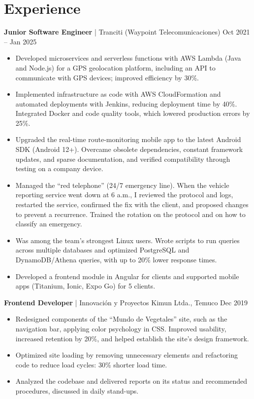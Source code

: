 \documentclass[10pt,letterpaper]{article}
\newcommand{\cvjob}[3]{%
  \vspace{5pt}%
  \textbf{#1} | #2 \hfill #3\par\vspace{1pt}}
\begin{document}
\section{Experience}

\cvjob{Junior Software Engineer}{Tranciti (Waypoint Telecomunicaciones)}{Oct 2021 -- Jan 2025}
\begin{itemize}
  \item Developed microservices and serverless functions with AWS Lambda (Java and Node.js) for a GPS geolocation platform, including an API to communicate with GPS devices; improved efficiency by 30\%.
  \item Implemented infrastructure as code with AWS CloudFormation and automated deployments with Jenkins, reducing deployment time by 40\%. Integrated Docker and code quality tools, which lowered production errors by 25\%.
  \item Upgraded the real-time route-monitoring mobile app to the latest Android SDK (Android 12+). Overcame obsolete dependencies, constant framework updates, and sparse documentation, and verified compatibility through testing on a company device.
  \item Managed the ``red telephone'' (24/7 emergency line). When the vehicle reporting service went down at 6 a.m., I reviewed the protocol and logs, restarted the service, confirmed the fix with the client, and proposed changes to prevent a recurrence. Trained the rotation on the protocol and on how to classify an emergency.
  \item Was among the team's strongest Linux users. Wrote scripts to run queries across multiple databases and optimized PostgreSQL and DynamoDB/Athena queries, with up to 20\% lower response times.
  \item Developed a frontend module in Angular for clients and supported mobile apps (Titanium, Ionic, Expo Go) for 5 clients.
\end{itemize}

\cvjob{Frontend Developer}{Innovación y Proyectos Kimun Ltda., Temuco}{Dec 2019}
\begin{itemize}
  \item Redesigned components of the ``Mundo de Vegetales'' site, such as the navigation bar, applying color psychology in CSS. Improved usability, increased retention by 20\%, and helped establish the site's design framework.
  \item Optimized site loading by removing unnecessary elements and refactoring code to reduce load cycles: 30\% shorter load time.
  \item Analyzed the codebase and delivered reports on its status and recommended procedures, discussed in daily stand-ups.
\end{itemize}
\end{document}
